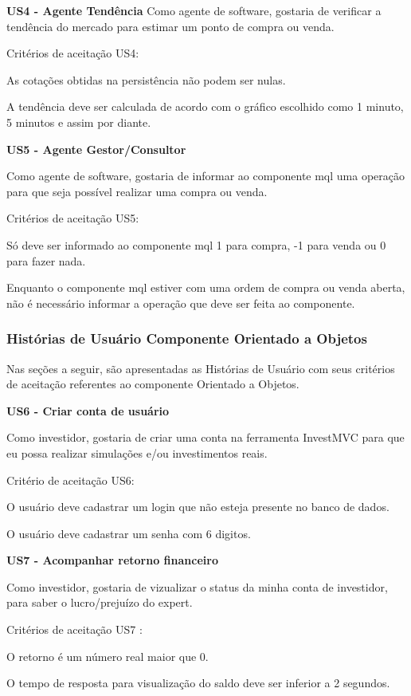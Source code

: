 \textbf{US4 - Agente Tendência}
Como agente de software, gostaria de verificar a tendência do mercado para estimar um ponto de compra ou venda.

Critérios de aceitação US4:

As cotações obtidas na persistência não podem ser nulas.

A tendência deve ser calculada de acordo com o gráfico escolhido como 1 minuto, 5 minutos e assim por diante.

\textbf{US5 - Agente Gestor/Consultor}

Como agente de software, gostaria de informar ao componente mql uma operação para que seja possível realizar uma compra ou venda.

Critérios de aceitação US5:

Só deve ser informado ao componente mql 1 para compra, -1 para venda ou 0 para fazer nada.

Enquanto o componente mql estiver com uma ordem de compra ou venda aberta, não é necessário informar a operação que deve ser feita ao componente.


\subsubsection{Histórias de Usuário Componente Orientado a Objetos}

Nas seções a seguir, são apresentadas as Histórias de Usuário com seus critérios de aceitação referentes ao componente Orientado a Objetos.

\textbf{US6 - Criar conta de usuário}

Como investidor, gostaria de criar uma conta na ferramenta InvestMVC para que eu possa realizar simulações e/ou investimentos reais.

Critério de aceitação US6:

O usuário deve cadastrar um login que não esteja presente no banco de dados.

O usuário deve cadastrar um senha com 6 digitos.

\textbf{US7 - Acompanhar retorno financeiro}

Como investidor, gostaria de vizualizar o status da minha conta de investidor, para saber o lucro/prejuízo do expert.

Critérios de aceitação US7 :

O retorno é um número real maior que 0.

O tempo de resposta para visualização do saldo deve ser inferior a 2 segundos.

